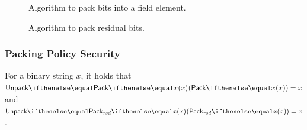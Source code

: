 \begin{figure}
    \begin{minipage}[t]{.4\textwidth}
        \centering
        \caption{Algorithm to pack bits into a field element.}\label{zeth-protocol:fig:packing-alg}
    \end{minipage}%
    \begin{minipage}[t]{.6\textwidth}
        \centering
        \caption{Algorithm to pack residual bits.}\label{zeth-protocol:fig:packing-resbits-alg}
    \end{minipage}
\end{figure}

\subsubsection{Packing Policy Security}
\begin{proposition}
    For a binary string $x$, it holds that $\unpack{\pack{x}{}}{} = x$ and $\unpack{\packResBits{x}}{} = x$.
\end{proposition}

